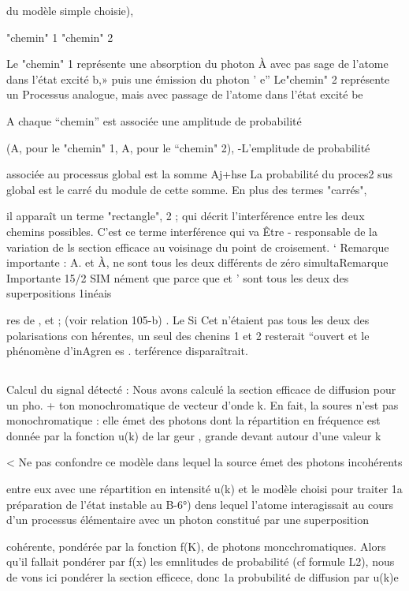 du modèle simple choisie),

"chemin" 1 "chemin" 2

Le "chemin" 1 représente une absorption du photon À  avec pas
sage de l'atome dans l'état excité b,» puis une émission du photon ' e”
Le"chemin" 2 représente un Processus analogue, mais avec passage de l'atome
dans l'état excité be

A chaque “chemin” est associée une amplitude de probabilité

(A, pour le "chemin" 1, A, pour le “chemin" 2), -L'emplitude de probabilité

associée au processus global est la somme Aj+hse La probabilité du proces2
sus global est le carré du module de cette somme. En plus des termes "carrés",

il apparaît un terme "rectangle", 2 ; qui décrit l'interférence
entre les deux chemins possibles. C'est ce terme interférence qui va Être
- responsable de la variation de ls section efficace au voisinage du point de
croisement. ‘
Remarque importante : A. et À, ne sont tous les deux différents de zéro simultaRemarque Importante 15/2 SIM
nément que parce que  et ’ sont tous les deux des superpositions 1inéais

res de , et ; (voir relation 105-b)
 . Le
Si Cet  n'étaient pas tous les deux des polarisations con
hérentes, un seul des chenins 1 et 2 resterait “ouvert et le phénomène d'inAgren es .
terférence disparaîtrait.
\subsection{} Calcul du signal détecté :%
Nous avons calculé la section efficace de diffusion pour un pho. +
ton monochromatique de vecteur d'onde k.
En fait, la soures n'est pas monochromatique : elle émet des photons dont la répartition en fréquence est donnée par la fonction u(k) de lar
geur , grande devant  autour d'une valeur k

< Ne pas confondre ce modèle dans lequel la source émet des photons incohérents

entre eux avec une répartition en intensité u(k) et le modèle choisi pour traiter
1a préparation de l'état instable au  B-6°) dens lequel l'atome interagissait au
cours d'un processus élémentaire avec un photon constitué par une superposition

cohérente, pondérée par la fonction f(K), de photons moncchromatiques. Alors qu'il
fallait pondérer par f(x) les emnlitudes de probabilité (cf formule L2), nous de
vons ici pondérer la section efficece, donc 1a probubilité de diffusion par u(k)e


